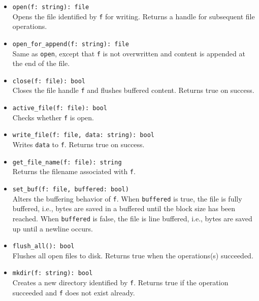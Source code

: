 \documentclass[10pt,landscape]{article}
\begin{document}
\begin{multicols*}{2}
\begin{itemize}
  \item \verb|open(f: string): file|\\
    Opens the file identified by \texttt{f} for writing. Returns a handle
    for subsequent file operations.
  \item \verb|open_for_append(f: string): file|\\
    Same as \texttt{open}, except that \texttt{f} is not overwritten and
    content is appended at the end of the file.
  \item \verb|close(f: file): bool|\\
    Closes the file handle \texttt{f} and flushes buffered content. Returns
    true on success.
  \item \verb|active_file(f: file): bool|\\
    Checks whether \texttt{f} is open.
  \item \verb|write_file(f: file, data: string): bool|\\
    Writes \texttt{data} to \texttt{f}. Returns true on success.
  \item \verb|get_file_name(f: file): string|\\
    Returns the filename associated with \texttt{f}.
  \item \verb|set_buf(f: file, buffered: bool)|\\
    Alters the buffering behavior of \texttt{f}. When \texttt{buffered} is
    true, the file is fully buffered, i.e., bytes are saved in a buffered until
    the block size has been reached. When \texttt{buffered} is false, the file
    is line buffered, i.e., bytes are saved up until a newline occurs.
  \item \verb|flush_all(): bool|\\
    Flushes all open files to disk.
    Returns true when the operations(s) succeeded.
  \item \verb|mkdir(f: string): bool|\\
    Creates a new directory identified by \texttt{f}. Returns true if the
    operation succeeded and \texttt{f} does not exist already.
\end{itemize}

\end{multicols*}
\end{document}
